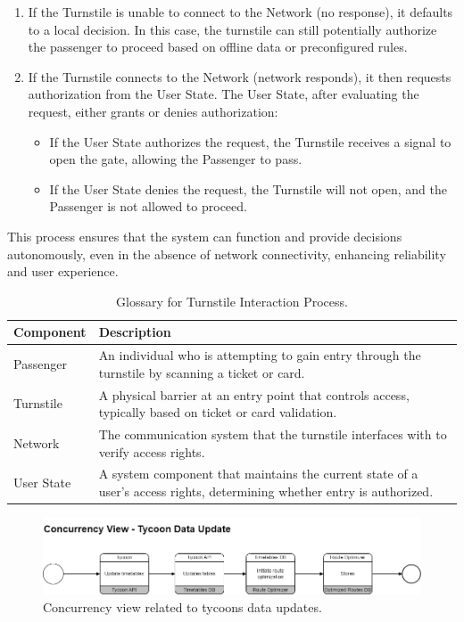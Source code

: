 \begin{enumerate}
    \item If the Turnstile is unable to connect to the Network (no response), it defaults to a local decision. In this case, the turnstile can still potentially authorize the passenger to proceed based on offline data or preconfigured rules.
    \item If the Turnstile connects to the Network (network responds), it then requests authorization from the User State. The User State, after evaluating the request, either grants or denies authorization:
    \begin{itemize}
        \item If the User State authorizes the request, the Turnstile receives a signal to open the gate, allowing the Passenger to pass.
        \item If the User State denies the request, the Turnstile will not open, and the Passenger is not allowed to proceed.
    \end{itemize}
\end{enumerate}

This process ensures that the system can function and provide decisions autonomously, even in the absence of network connectivity, enhancing reliability and user experience.

\begin{table}[H]
    \centering
    \caption{Glossary for Turnstile Interaction Process.}
    \label{tab:turnstile_interaction_glossary}
    \begin{tabularx}{\textwidth}{@{}lX@{}} %
    \toprule
    \textbf{Component} & \textbf{Description} \\
    \midrule
    Passenger & An individual who is attempting to gain entry through the turnstile by scanning a ticket or card. \\
    Turnstile & A physical barrier at an entry point that controls access, typically based on ticket or card validation. \\
    Network & The communication system that the turnstile interfaces with to verify access rights. \\
    User State & A system component that maintains the current state of a user's access rights, determining whether entry is authorized. \\
    \bottomrule
    \end{tabularx}
\end{table}

\begin{figure}[H]
    \centering
    \includegraphics[width=\textwidth]{drawings/views_final_version/concurrency_view_3.png}
    \caption{Concurrency view related to tycoons data updates.}
    \label{fig:concurrency_view_3}
\end{figure}

